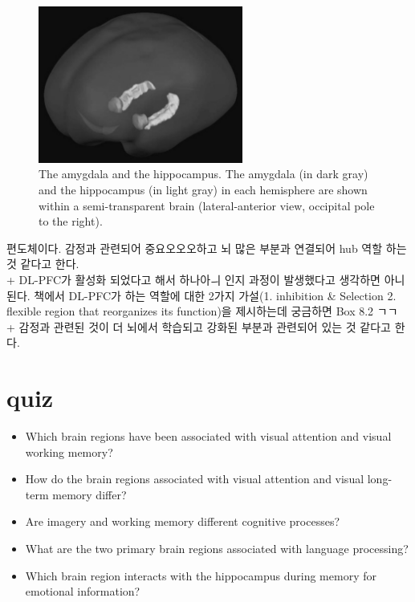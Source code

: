\documentclass[../note.tex]{subfiles}
\begin{document}
\begin{figure}[htbp]
  \centering
  \includegraphics[width=0.6\textwidth]{image/ch8_amygdala}
  \caption{The amygdala and the hippocampus. The amygdala (in dark gray) and the
hippocampus (in light gray) in each hemisphere are shown within a semi-transparent brain
(lateral-anterior view, occipital pole to the right).}
  \label{fig:ch8_amygdala}
\end{figure}

편도체이다. 감정과 관련되어 중요오오오하고 뇌 많은 부분과 연결되어 hub 역할 하는 것 같다고 한다.\\

+ DL-PFC가 활성화 되었다고 해서 하나아ㅢ 인지 과정이 발생했다고 생각하면 아니된다. 책에서 DL-PFC가 하는 역할에 대한 2가지 가설(1. inhibition \& Selection 2. flexible region that reorganizes its
function)을 제시하는데 궁금하면 Box 8.2 ㄱㄱ\\

+ 감정과 관련된 것이 더 뇌에서 학습되고 강화된 부분과 관련되어 있는 것 같다고 한다.

\section{quiz}
\begin{itemize}
  \item
Which brain regions have been associated with visual attention and visual working memory?
  \item
How do the brain regions associated with visual attention and visual long-term memory differ?
  \item
Are imagery and working memory different cognitive processes?
  \item
What are the two primary brain regions associated with language
processing?
  \item
Which brain region interacts with the hippocampus during memory for emotional information?
\end{itemize}
\end{document}
